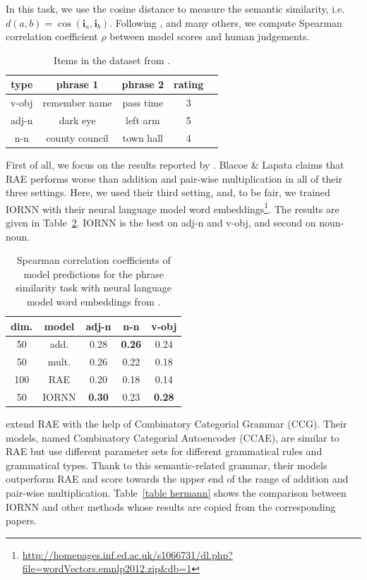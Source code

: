 \documentclass[11pt]{article}
\begin{document}
In this task, we use the cosine distance to measure the semantic similarity, 
i.e. $d(a,b) = \cos(\mathbf{i}_a,\mathbf{i}_b)$. Following \cite{blacoe_comparison_2012}, 
\cite{hermann2013role} and many others, we compute Spearman correlation coefficient $\rho$
between model scores and human judgements.


\begin{table}[h!]
	\center
	\begin{tabular}{ccccc}
		type & phrase 1 & phrase 2 & rating \\ \hline 
		v-obj & remember name &  pass time & 3 \\ 
		adj-n & dark eye & left arm & 5 \\ 
		n-n & county council & town hall & 4 \\ \hline
	\end{tabular}
	\caption{Items in the dataset from \cite{mitchell_composition_2010}.}
	\label{table compounds}
\end{table}	

First of all, we focus on the results reported by \cite{blacoe_comparison_2012}. Blacoe \& Lapata 
claims that RAE performs worse than addition and pair-wise multiplication in all of their three settings. 
Here, we used their third setting, and, to be fair, we trained IORNN with their neural language model word embeddings\footnote{\url{http://homepages.inf.ed.ac.uk/s1066731/dl.php?file=wordVectors.emnlp2012.zip&db=1}}.
The results are given in Table~\ref{table blacoe}. IORNN is the best on adj-n and v-obj, and second on noun-noun.
\begin{table}[h!]
	\center
	\begin{tabular}{ccccc}
		dim. & model & adj-n & n-n & v-obj \\ \hline 
		50 & add. & 0.28 & \textbf{0.26} & 0.24 \\ 
		50 & mult. & 0.26 & 0.22 & 0.18 \\ 
		100 & RAE & 0.20 & 0.18 & 0.14 \\ \hline
		50 & IORNN & \textbf{0.30} & 0.23 & \textbf{0.28} \\ \hline
	\end{tabular}
	\caption{Spearman correlation coefficients of model predictions for the phrase similarity task
	with neural language model word embeddings from \cite{blacoe_comparison_2012}.}
	\label{table blacoe}
\end{table}

\cite{hermann2013role} extend RAE with the help of Combinatory Categorial Grammar (CCG). 
Their models, named Combinatory Categorial Autoencoder (CCAE), are similar 
to RAE but use different parameter sets for different grammatical rules and grammatical types. 
Thank to this semantic-related grammar, their models outperform RAE and score towards 
the upper end of the range of addition and pair-wise multiplication. Table~\ref{table hermann}
shows the comparison between IORNN and other methods whose results are copied from 
the corresponding papers. 
\end{document}
